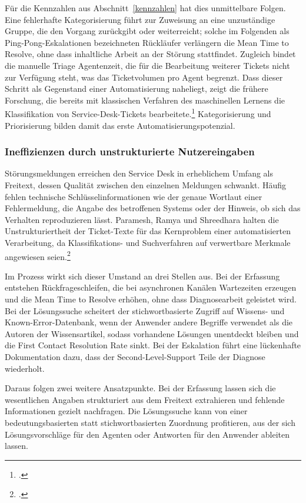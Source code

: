 F\"ur die Kennzahlen aus Abschnitt~\ref{kennzahlen} hat dies unmittelbare Folgen. Eine fehlerhafte Kategorisierung f\"uhrt zur Zuweisung an eine unzust\"andige Gruppe, die den Vorgang zur\"uckgibt oder weiterreicht; solche im Folgenden als Ping-Pong-Eskalationen bezeichneten R\"uckl\"aufer verl\"angern die Mean Time to Resolve, ohne dass inhaltliche Arbeit an der St\"orung stattfindet. Zugleich bindet die manuelle Triage Agentenzeit, die f\"ur die Bearbeitung weiterer Tickets nicht zur Verf\"ugung steht, was das Ticketvolumen pro Agent begrenzt. Dass dieser Schritt als Gegenstand einer Automatisierung naheliegt, zeigt die fr\"uhere Forschung, die bereits mit klassischen Verfahren des maschinellen Lernens die Klassifikation von Service-Desk-Tickets bearbeitete.\footcite[Vgl.][hier S.~331]{Paramesh2019} Kategorisierung und Priorisierung bilden damit das erste Automatisierungspotenzial.

\subsubsection{Ineffizienzen durch unstrukturierte Nutzereingaben}
\label{unstrukturiert}

St\"orungsmeldungen erreichen den Service Desk in erheblichem Umfang als Freitext, dessen Qualit\"at zwischen den einzelnen Meldungen schwankt. H\"aufig fehlen technische Schl\"usselinformationen wie der genaue Wortlaut einer Fehlermeldung, die Angabe des betroffenen Systems oder der Hinweis, ob sich das Verhalten reproduzieren l\"asst. Paramesh, Ramya und Shreedhara halten die Unstrukturiertheit der Ticket-Texte f\"ur das Kernproblem einer automatisierten Verarbeitung, da Klassifikations- und Suchverfahren auf verwertbare Merkmale angewiesen seien.\footcite[Vgl.][S.~221]{Ramya2018}

Im Prozess wirkt sich dieser Umstand an drei Stellen aus. Bei der Erfassung entstehen R\"uckfrageschleifen, die bei asynchronen Kan\"alen Wartezeiten erzeugen und die Mean Time to Resolve erh\"ohen, ohne dass Diagnosearbeit geleistet wird. Bei der L\"osungssuche scheitert der stichwortbasierte Zugriff auf Wissens- und Known-Error-Datenbank, wenn der Anwender andere Begriffe verwendet als die Autoren der Wissensartikel, sodass vorhandene L\"osungen unentdeckt bleiben und die First Contact Resolution Rate sinkt. Bei der Eskalation f\"uhrt eine l\"uckenhafte Dokumentation dazu, dass der Second-Level-Support Teile der Diagnose wiederholt.

Daraus folgen zwei weitere Ansatzpunkte. Bei der Erfassung lassen sich die wesentlichen Angaben strukturiert aus dem Freitext extrahieren und fehlende Informationen gezielt nachfragen. Die L\"osungssuche kann von einer bedeutungsbasierten statt stichwortbasierten Zuordnung profitieren, aus der sich L\"osungsvorschl\"age f\"ur den Agenten oder Antworten f\"ur den Anwender ableiten lassen.

